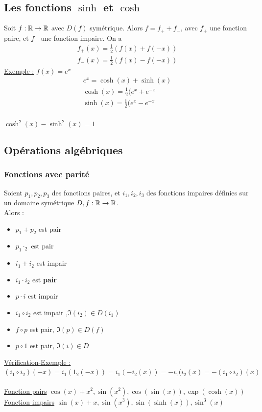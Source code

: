 \documentclass[12pt,a4paper]{article}
\begin{document}
{\subsection{Les fonctions $\sinh$ et $\cosh$}
 Soit $f:\mathbb{R} \to \mathbb{R}$ avec $D(f)$ symétrique. Alors $f =  f_+ + f_-$, avec $f_+$ une fonction paire, et $f_-$ une fonction impaire. On a
\begin{align*}
	f_+(x) = \frac{1}{2}(f(x) + f(-x))\\
	f_-(x) = \frac{1}{2}(f(x)-f(-x))
\end{align*}
\underline{Exemple :} $f(x) = e^x$
\begin{align*}
	e^x = \cosh(x) + \sinh(x)\\
	\cosh(x) = \frac{1}{2}(e^x+e^{-x}\\
	\sinh(x) = \frac{1}{2}(e^x-e^{-x}\\
\end{align*}
\begin{boite}[0.3]
	$\cosh^2(x)-\sinh^2(x) = 1$
\end{boite}
\subsection{Opérations algébriques}
\subsubsection{Fonctions avec parité}
Soient $p_1,p_2,p_3$ des fonctions paires, et $i_1,i_2,i_3$ des fonctions impaires définies sur un domaine symétrique $D, f:\mathbb{R} \to \mathbb{R}$.\\
Alors :
\begin{itemize}
	\item $p_1+p_2$ est pair
	\item $p_1\cdotp_2$ est pair
	\item $i_1+i_2$ est impair
	\item $i_1\cdot i_2$ est \textbf{pair}
	\item $p\cdot i$ est impair
	\item $i_1 \circ i_2$ est impair ,$\Im(i_2) \in D(i_1)$
	\item $f\circ p$ est pair, $\Im(p) \in D(f)$
	\item $p \circ 1$ est pair, $\Im(i) \in D$
\end{itemize}
\underline{Vérification-Exemple :} $(i_1\circ i_2)(-x) = i_1(1_2(-x)) = i_1(-i_2(x)) = -i_1(i_2(x) = -(i_1\circ i_2)(x)$\\
\\
\underline{Fonction pairs} $\cos(x) + x^2, \sin(x^2), \cos(\sin(x)), \exp(\cosh(x))$\\
\underline{Fonction impairs} $\sin(x) + x, \sin(x^3),  \sin(\sinh(x)), \sin^3(x)$
}
\end{document}
